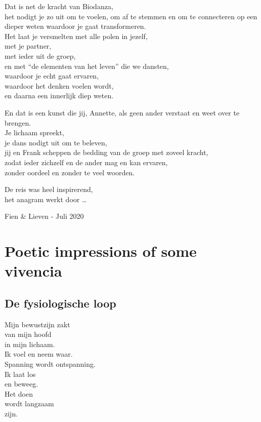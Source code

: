 \documentclass[
  11pt,
]{book}
\begin{document}
Dat is net de kracht van Biodanza,\\
het nodigt je zo uit om te voelen, om af te stemmen en om te connecteren op een dieper weten waardoor je gaat transformeren.\\
Het laat je versmelten met alle polen in jezelf,\\
met je partner,\\
met ieder uit de groep,\\
en met ``de elementen van het leven'' die we dansten,\\
waardoor je echt gaat ervaren,\\
waardoor het denken voelen wordt,\\
en daarna een innerlijk diep weten.

En dat is een kunst die jij, Annette, als geen ander verstaat en weet over te brengen.\\
Je lichaam spreekt,\\
je dans nodigt uit om te beleven,\\
jij en Frank scheppen de bedding van de groep met zoveel kracht,\\
zodat ieder zichzelf en de ander mag en kan ervaren,\\
zonder oordeel en zonder te veel woorden.

De reis was heel inspirerend,\\
het anagram werkt door \ldots{}

Fien \& Lieven - Juli 2020

\hypertarget{poetic-impressions-of-some-vivencia}{%
\section*{Poetic impressions of some vivencia}\label{poetic-impressions-of-some-vivencia}}

\hypertarget{de-fysiologische-loop}{%
\subsection*{De fysiologische loop}\label{de-fysiologische-loop}}

Mijn bewustzijn zakt\\
van mijn hoofd\\
in mijn lichaam.\\
Ik voel en neem waar.\\
Spanning wordt ontspanning.\\
Ik laat los\\
en beweeg.\\
Het doen\\
wordt langzaam\\
zijn.
\end{document}
